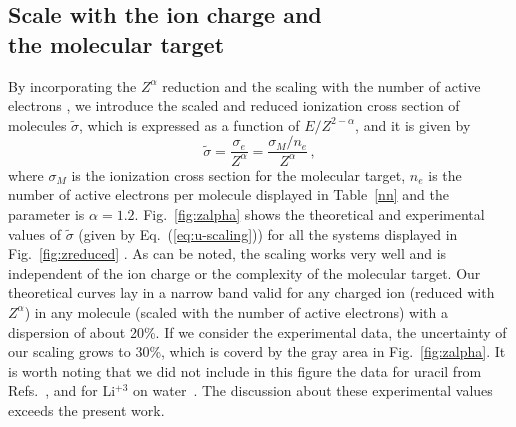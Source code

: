 \documentclass[10pt,showpacs,showkeys,twocolumn]{revtex4-1}
\begin{document}
\subsection{Scale with the ion charge and \\ the molecular target}

By incorporating the $Z^\alpha$ reduction and the scaling with the %
number  of active electrons%
, we introduce the scaled and reduced
ionization cross section of molecules $\tilde{\sigma}$, which is 
expressed as a function of $E/Z^{2-\alpha}$, and it is given by
\begin{equation}
 \tilde{\sigma}=\frac{\sigma_e}{Z^{\alpha}}=\frac{\sigma_M/n_e}{Z^{\alpha}}\,,
\label{eq:u-scaling}
\end{equation}
where $\sigma_M$ is the ionization cross section for the molecular target, 
$n_e$ is the number of active electrons per molecule displayed in 
Table~\ref{nn} and the parameter is $\alpha=1.2$.
Fig.~\ref{fig:zalpha} shows the %
theoretical and 
experimental values of $ \tilde{\sigma}$ (given by Eq.~(\ref{eq:u-scaling})) %
for all the systems displayed in Fig.~\ref{fig:zreduced}%
. As can be noted, the scaling works very well
and is independent of the ion charge or the complexity of the molecular
target. 
Our theoretical curves lay in a narrow band valid for any charged ion 
(reduced with $Z^\alpha$) in any molecule (scaled with the number of 
active electrons) with a dispersion of about 20\%. If we consider
the experimental data, the uncertainty of our scaling grows to 30\%, 
which is coverd by %
the gray area in Fig.~\ref{fig:zalpha}.
It is worth noting that we did not include in this figure %
the data for uracil from Refs.~\cite{agnihotri2012,agnihotri2013}, 
and for Li$^{+3}$ on water~\cite{Luna_Li_water}. The discussion 
about these experimental values exceeds the present work. 
\end{document}
